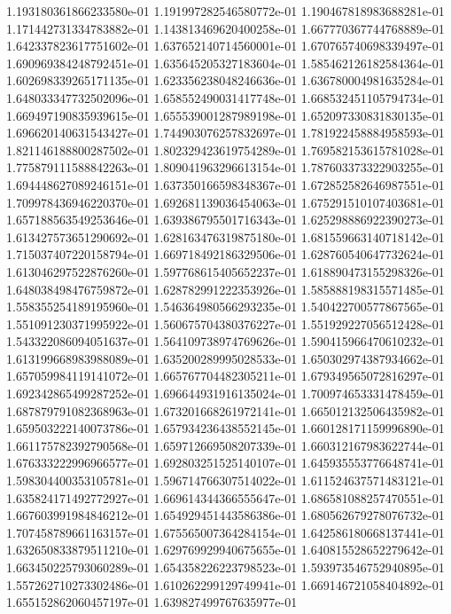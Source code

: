 1.193180361866233580e-01
1.191997282546580772e-01
1.190467818983688281e-01
1.171442731334783882e-01
1.143813469620400258e-01
1.667770367744768889e-01
1.642337823617751602e-01
1.637652140714560001e-01
1.670765740698339497e-01
1.690969384248792451e-01
1.635645205327183604e-01
1.585462126182584364e-01
1.602698339265171135e-01
1.623356238048246636e-01
1.636780004981635284e-01
1.648033347732502096e-01
1.658552490031417748e-01
1.668532451105794734e-01
1.669497190835939615e-01
1.655539001287989198e-01
1.652097330831830135e-01
1.696620140631543427e-01
1.744903076257832697e-01
1.781922458884958593e-01
1.821146188800287502e-01
1.802329423619754289e-01
1.769582153615781028e-01
1.775879111588842263e-01
1.809041963296613154e-01
1.787603373322903255e-01
1.694448627089246151e-01
1.637350166598348367e-01
1.672852582646987551e-01
1.709978436946220370e-01
1.692681139036454063e-01
1.675291510107403681e-01
1.657188563549253646e-01
1.639386795501716343e-01
1.625298886922390273e-01
1.613427573651290692e-01
1.628163476319875180e-01
1.681559663140718142e-01
1.715037407220158794e-01
1.669718492186329506e-01
1.628760540647732624e-01
1.613046297522876260e-01
1.597768615405652237e-01
1.618890473155298326e-01
1.648038498476759872e-01
1.628782991222353926e-01
1.585888198315571485e-01
1.558355254189195960e-01
1.546364980566293235e-01
1.540422700577867565e-01
1.551091230371995922e-01
1.560675704380376227e-01
1.551929227056512428e-01
1.543322086094051637e-01
1.564109738974769626e-01
1.590415966470610232e-01
1.613199668983988089e-01
1.635200289995028533e-01
1.650302974387934662e-01
1.657059984119141072e-01
1.665767704482305211e-01
1.679349565072816297e-01
1.692342865499287252e-01
1.696644931916135024e-01
1.700974653331478459e-01
1.687879791082368963e-01
1.673201668261972141e-01
1.665012132506435982e-01
1.659503222140073786e-01
1.657934236438552145e-01
1.660128171159996890e-01
1.661175782392790568e-01
1.659712669508207339e-01
1.660312167983622744e-01
1.676333222996966577e-01
1.692803251525140107e-01
1.645935553776648741e-01
1.598304400353105781e-01
1.596714766307514022e-01
1.611524637571483121e-01
1.635824171492772927e-01
1.669614344366555647e-01
1.686581088257470551e-01
1.667603991984846212e-01
1.654929451443586386e-01
1.680562679278076732e-01
1.707458789661163157e-01
1.675565007364284154e-01
1.642586180668137441e-01
1.632650833879511210e-01
1.629769929940675655e-01
1.640815528652279642e-01
1.663450225793060289e-01
1.654358226223798523e-01
1.593973546752940895e-01
1.557262710273302486e-01
1.610262299129749941e-01
1.669146721058404892e-01
1.655152862060457197e-01
1.639827499767635977e-01
